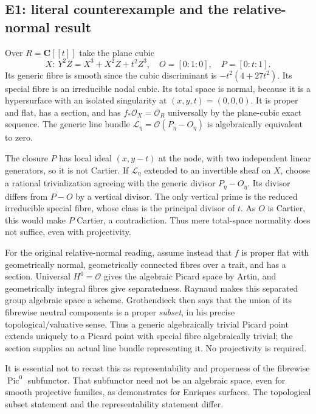 \subsection{E1: literal counterexample and the relative-normal result}

Over $R=\mathbf C[[t]]$ take the plane cubic
\[
 X:\ Y^2Z=X^3+X^2Z+t^2Z^3,
 \quad O=[0:1:0],\quad P=[0:t:1].
\]
Its generic fibre is smooth since the cubic discriminant is
$-t^2(4+27t^2)$. Its special fibre is an irreducible nodal cubic. Its total
space is normal, because it is a hypersurface with an isolated singularity
at $(x,y,t)=(0,0,0)$. It is proper and flat, has a section, and has
$f_*\mathcal O_X=\mathcal O_R$ universally by the plane-cubic exact sequence.
The generic line bundle $\mathcal L_\eta=\mathcal O(P_\eta-O_\eta)$ is
algebraically equivalent to zero.

The closure $P$ has local ideal $(x,y-t)$ at the node, with two independent
linear generators, so it is not Cartier. If $\mathcal L_\eta$ extended to
an invertible sheaf on $X$, choose a rational trivialization agreeing with
the generic divisor $P_\eta-O_\eta$. Its divisor differs from $P-O$ by a
vertical divisor. The only vertical prime is the reduced irreducible special
fibre, whose class is the principal divisor of $t$. As $O$ is Cartier, this
would make $P$ Cartier, a contradiction. Thus mere total-space normality does
not suffice, even with projectivity.

For the original relative-normal reading, assume instead that $f$ is proper
flat with geometrically normal, geometrically connected fibres over a trait,
and has a section. Universal $H^0=\mathcal O$ gives the algebraic Picard space
by Artin, and geometrically integral fibres give separatedness. Raynaud
\cite[Theorem~3.3.1, p.~40]{Raynaud1970} makes this separated group algebraic
space a scheme. Grothendieck \cite[Theorem~1.1(i), Corollary~2.3]{Grothendieck1962VI}
then says that the union of its fibrewise neutral components is a proper
\emph{subset}, in his precise topological/valuative sense. Thus a generic
algebraically trivial Picard point extends uniquely to a Picard point with
special fibre algebraically trivial; the section supplies an actual line
bundle representing it. No projectivity is required.

It is essential not to recast this as representability and properness of
the fibrewise $\operatorname{Pic}^0$ subfunctor. That subfunctor need not be an
algebraic space, even for smooth projective families, as
\cite[Proposition~2.2]{LaurentSchroer2024} demonstrates for Enriques surfaces.
The topological subset statement and the representability statement differ.

